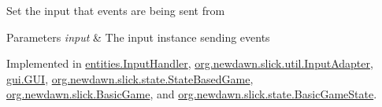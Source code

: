 Set the input that events are being sent from


\begin{DoxyParams}{Parameters}
{\em input} & The input instance sending events \\
\hline
\end{DoxyParams}


Implemented in \mbox{\hyperlink{classentities_1_1_input_handler_ad3a1eb35970a169a68b3c01246562a3e}{entities.\+Input\+Handler}}, \mbox{\hyperlink{classorg_1_1newdawn_1_1slick_1_1util_1_1_input_adapter_ab5a715a6c56f677a08be343868877ae3}{org.\+newdawn.\+slick.\+util.\+Input\+Adapter}}, \mbox{\hyperlink{classgui_1_1_g_u_i_a58f6de4eaf3f446b6a6efd30121091df}{gui.\+G\+UI}}, \mbox{\hyperlink{classorg_1_1newdawn_1_1slick_1_1state_1_1_state_based_game_a0d9931474b8c383d9cbf3026fc3a9c07}{org.\+newdawn.\+slick.\+state.\+State\+Based\+Game}}, \mbox{\hyperlink{classorg_1_1newdawn_1_1slick_1_1_basic_game_ac9847e7f185de833f745fd75b8b5730b}{org.\+newdawn.\+slick.\+Basic\+Game}}, and \mbox{\hyperlink{classorg_1_1newdawn_1_1slick_1_1state_1_1_basic_game_state_ae453e5cfaf7e00181a981ca4e25bb82e}{org.\+newdawn.\+slick.\+state.\+Basic\+Game\+State}}.

